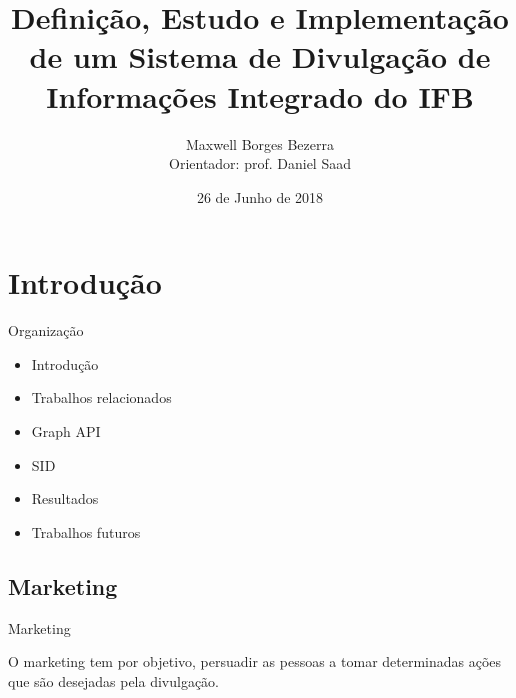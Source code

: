 \documentclass{aula-ifb}
\author{Maxwell Borges Bezerra\\ 
\small{Orientador: prof. Daniel Saad}}
\title{Definição, Estudo e Implementação de um Sistema de Divulgação de Informações Integrado do IFB}
\institute{Instituto Federal de Brasília, Câmpus Taguatinga}
\date{26 de Junho de 2018}
\begin{document}
\maketitle
\section{Introdução}
\begin{frame}{Organização}
\begin{itemize}
\item Introdução
\item Trabalhos relacionados
\item Graph API
\item SID
\item Resultados
\item Trabalhos futuros
\end{itemize}
\end{frame}

\subsection{Marketing}
\begin{frame}{Marketing}
\begin{center}
O marketing tem por objetivo, persuadir as pessoas a tomar determinadas ações que são desejadas pela divulgação.
\end{center}
\end{frame}
\end{document}
